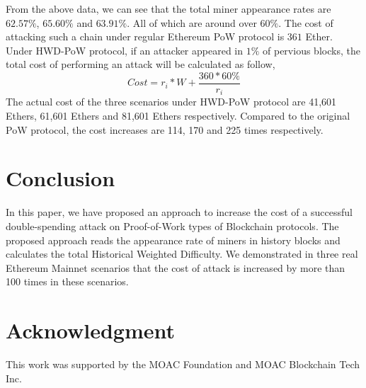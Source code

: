 \documentclass[conference]{IEEEtran}
\begin{document}
From the above data, we can see that the total miner appearance rates are $62.57\%$, $65.60\%$ and $63.91\%$. All of which are around over $60\%$. The cost of attacking such a chain under regular Ethereum PoW protocol is $361$ Ether. Under HWD-PoW protocol, if an attacker appeared in $1\%$ of pervious blocks, the total cost of performing an attack will be calculated as follow,
\begin{equation}
    Cost = r_i * W + \frac{360 * 60\%}{r_i}\label{eq}
\end{equation}
The actual cost of the three scenarios under HWD-PoW protocol are 41,601 Ethers, 61,601 Ethers and 81,601 Ethers respectively. Compared to the original PoW protocol, the cost increases are 114, 170 and 225 times respectively.

\section{Conclusion}

In this paper, we have proposed an approach to increase the cost of a successful double-spending attack on Proof-of-Work types of Blockchain protocols. The proposed approach reads the appearance rate of miners in history blocks and calculates the total Historical Weighted Difficulty. We demonstrated in three real Ethereum Mainnet scenarios that the cost of attack is increased by more than 100 times in these scenarios.

\section*{Acknowledgment}

This work was supported by the MOAC Foundation and MOAC Blockchain Tech Inc.
\end{document}
